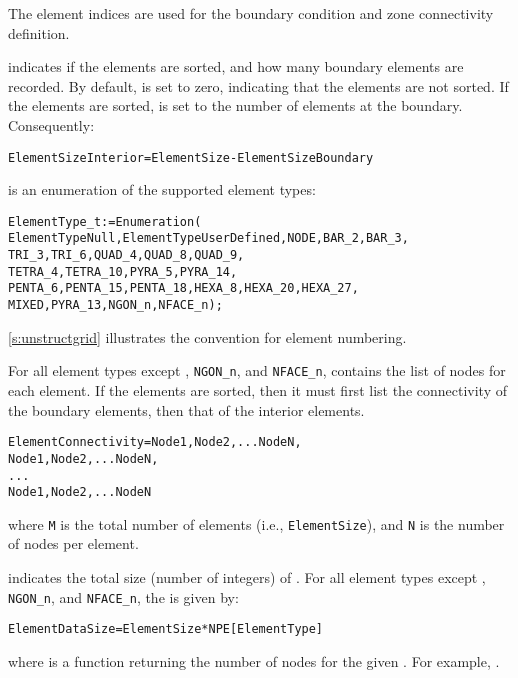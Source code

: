 The element indices are used for the boundary condition and zone
connectivity definition.

 indicates if the elements are sorted, and
how many boundary elements are recorded.
By default,  is set to zero, indicating that
the elements are not sorted.
If the elements are sorted,  is set to the
number of elements at the boundary.
Consequently:
\begin{alltt}
  ElementSizeInterior = ElementSize - ElementSizeBoundary
\end{alltt}

 is an enumeration of the supported element types:
\begin{alltt}
  ElementType\_t := Enumeration(
     ElementTypeNull, ElementTypeUserDefined, NODE, BAR\_2, BAR\_3,
     TRI\_3, TRI\_6, QUAD\_4, QUAD\_8, QUAD\_9,
     TETRA\_4, TETRA\_10, PYRA\_5, PYRA\_14,
     PENTA\_6, PENTA\_15, PENTA\_18, HEXA\_8, HEXA\_20, HEXA\_27,
     MIXED, PYRA\_13, NGON\_n, NFACE\_n );
\end{alltt}
\autoref{s:unstructgrid} illustrates the convention for element numbering.

For all element types except , \texttt{NGON\_n},
and \texttt{NFACE\_n}, 
contains the list of nodes for each element.
If the elements are sorted, then it must first list the connectivity of
the boundary elements, then that of the interior elements.
\begin{alltt}
  ElementConnectivity = Node1, Node2, ... NodeN,
                        Node1, Node2, ... NodeN,
                        ...
                        Node1, Node2, ... NodeN
\end{alltt}
where \texttt{M} is the total number of elements (i.e.,
\texttt{ElementSize}), and \texttt{N} is the number of nodes per
element.

 indicates the total size (number of integers) of
.
For all element types except , \texttt{NGON\_n},
and \texttt{NFACE\_n}, the 
is given by:
\begin{alltt}
  ElementDataSize = ElementSize * NPE[ElementType]
\end{alltt}
where  is a function returning the number of
nodes for the given .
For example, .

